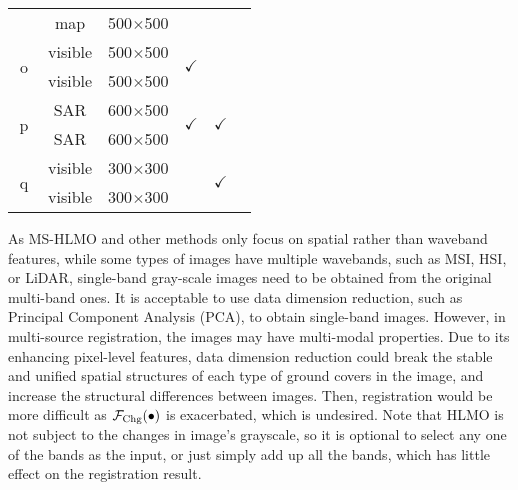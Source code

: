 \begin{table}[h!]
\begin{tabular}{ccccccc}
                      &                     &      map &  500$\times$500  &  &  &  \\ \cline{1-7}
   \multicolumn{2}{c}{\multirow{2}{*}{o}}   &  visible &  500$\times$500  & \multirow{2}{*}{$\checkmark$} &  &  \\
                      &                     &  visible &  500$\times$500  &  &  &  \\ \cline{1-7}
   \multicolumn{2}{c}{\multirow{2}{*}{p}}   &      SAR &  600$\times$500  & \multirow{2}{*}{$\checkmark$} & \multirow{2}{*}{$\checkmark$} &  \\
                      &                     &      SAR &  600$\times$500  &  &  &  \\ \cline{1-7}
   \multicolumn{2}{c}{\multirow{2}{*}{q}}   &  visible &  300$\times$300  &  & \multirow{2}{*}{$\checkmark$} &  \\
                      &                     &  visible &  300$\times$300  &  &  &  \\
  \bottomrule
 \end{tabular}
\end{table}

As MS-HLMO and other methods only focus on spatial rather than waveband features, while some types of images have multiple wavebands, such as MSI, HSI, or LiDAR, single-band gray-scale images need to be obtained from the original multi-band ones. It is acceptable to use data dimension reduction, such as Principal Component Analysis (PCA), to obtain single-band images. However, in multi-source registration, the images may have multi-modal properties. Due to its enhancing pixel-level features, data dimension reduction could break the stable and unified spatial structures of each type of ground covers in the image, and increase the structural differences between images. Then, registration would be more difficult as ${{\cal F}_{{\rm{Chg}}}}(\bullet)$ is exacerbated, which is undesired. Note that HLMO is not subject to the changes in image's grayscale, so it is optional to select any one of the bands as the input, or just simply add up all the bands, which has little effect on the registration result.

